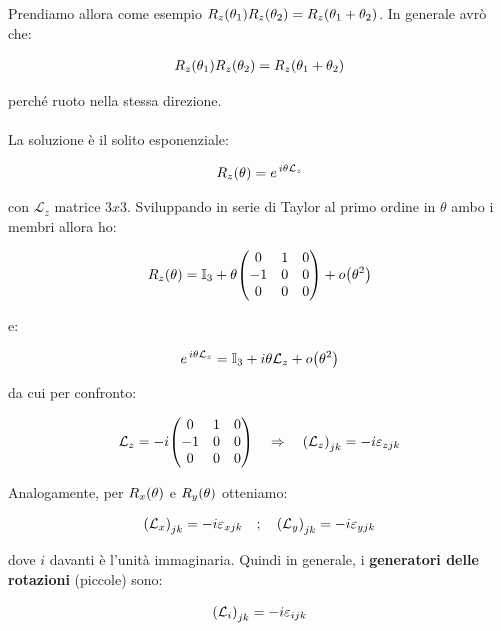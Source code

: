 	Prendiamo allora come esempio $R_z\qty(\theta_1) R_z\qty(\theta_2) = R_z\qty(\theta_1 + \theta_2)$. In generale avrò che:
	
\begin{align*}
	R_z\qty(\theta_1)R_z\qty(\theta_2) = R_z\qty(\theta_1 + \theta_2)
\end{align*}

	perché ruoto nella stessa direzione. 
	\\
	\\
	La soluzione è il solito esponenziale:

\begin{align*}
	R_z\qty(\theta) = e^{\, i \theta \mathcal{L}_z}
\end{align*}

	con $\mathcal{L}_z$ matrice $3x3$. Sviluppando in serie di Taylor al primo ordine in $\theta$ ambo i membri allora ho:
	
\begin{align*}
	R_z\qty(\theta) = \mathbb{I}_3 + \theta \mqty(0 & 1 & 0 \\ -1 & 0 & 0 \\ 0 & 0 & 0) + o\qty(\theta^2)
\end{align*}

	e:
	
\begin{align*}
	e^{\, i \theta \mathcal{L}_z} = \mathbb{I}_3 + i\theta \mathcal{L}_z + o\qty(\theta^2) 
\end{align*}

	da cui per confronto:
	
\begin{align*}
	\mathcal{L}_z = - i  \mqty(0 & 1 & 0 \\ -1 & 0 & 0 \\ 0 & 0 & 0) \quad \Rightarrow \quad \qty(\mathcal{L}_z)_{jk} = - i \varepsilon_{zjk}
\end{align*}

	Analogamente, per $R_x\qty(\theta)$ e $R_y\qty(\theta)$ otteniamo:
	
\begin{align*}
	\qty(\mathcal{L}_x)_{jk} = - i \varepsilon_{xjk} \quad ; \quad  \qty(\mathcal{L}_y)_{jk} = - i \varepsilon_{yjk}
\end{align*}

	dove $i$ davanti è l'unità immaginaria. Quindi in generale, i \textbf{generatori delle rotazioni} (piccole) sono:
	
\begin{align*}
	\qty(\mathcal{L}_i)_{jk} = - i \varepsilon_{ijk}
\end{align*}
	
